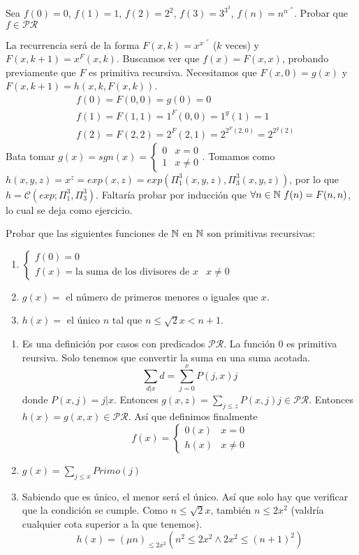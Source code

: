 \documentclass[twoside]{article}
\begin{document}
\begin{ejercicio}{7}
Sea $f(0)=0$, $f(1)=1$, $f(2)=2^2$, $f(3)=3^{3^3}$, $f(n)= n^{n^{\iddots^n}}$. Probar que $f\in\mathcal{PR}$
\end{ejercicio}
\begin{solucion}
La recurrencia será de la forma $F(x,k)=x^{x^{\iddots^x}}$ ($k$ veces) y $F(x,k+1)=x^F(x,k)$. Buscamos ver que $f(x)=F(x,x)$, probando previamente que $F$ es primitiva recursiva. Necesitamos que $F(x,0)=g(x)$ y $F(x,k+1)=h(x,k,F(x,k))$. 
\begin{align*}
&f(0)=F(0,0)=g(0)=0\\
&f(1)=F(1,1)=1^F(0,0)=1^g(1)=1\\
&f(2)=F(2,2)=2^F(2,1)=2^{2^F(2,0)}=2^{2^g(2)}
\end{align*}
Bata tomar $g(x)=sgn(x)=\begin{cases}
0 & x=0\\
1 & x\neq 0
\end{cases}$. Tomamos como $h(x,y,z)=x^z=exp(x,z)=exp(\Pi^3_1(x,y,z),\Pi^3_3(x,y,z))$, por lo que $h=\mathcal{C}(exp; \Pi^3_1,\Pi^3_3)$. Faltaría probar por inducción que $\forall n\in\mathbb{N}\ f(n)=F(n,n)$, lo cual se deja como ejercicio.
\end{solucion}

\newpage

\begin{ejercicio}{8}
Probar que las siguientes funciones de $\mathbb{N}$ en $\mathbb{N}$ son primitivas recursivas:
\begin{enumerate}
\item $\begin{cases}
f(0)=0\\
f(x) =\text{la suma de los divisores de } x & x\neq 0
\end{cases}$
\item $g(x)=$ el número de primeros menores o iguales que $x$.
\item $h(x)=$ el único $n$ tal que $n\leq\sqrt{2}x<n+1$.
\end{enumerate}
\end{ejercicio}
\begin{solucion}
\begin{enumerate}
\item Es una definición por casos con predicados $\mathcal{PR}$. La función 0 es primitiva reursiva. Solo tenemos que convertir la suma en una suma acotada. 
$$\sum_{d|x}d=\sum_{j=0}^xP(j,x)j$$
donde $P(x,j)=j|x$. Entonces $g(x,z)=\sum_{j\leq z}P(x,j)j\in\mathcal{PR}$. Entonces $h(x)=g(x,x)\in\mathcal{PR}$. Así que definimos finalmente
$$f(x)=\begin{cases}
0(x) & x=0\\
h(x) & x\neq 0
\end{cases}$$
\item $g(x)=\sum_{j\leq x}Primo(j)$
\item Sabiendo que es único, el menor será el único. Así que solo hay que verificar que la condición se cumple. Como $n\leq\sqrt{2}x$, también $n\leq 2x^2$ (valdría cualquier cota superior a la que tenemos).
$$h(x)=(\mu n)_{\leq 2x^2}(n^2\leq 2x^2\land 2x^2\leq (n+1)^2)$$
\end{enumerate}
\end{solucion}
\end{document}
